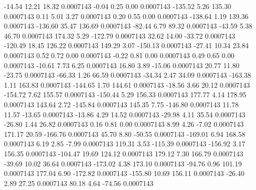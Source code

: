      -14.54       12.21       18.32     0.0007143
       -0.04        0.25        0.00     0.0007143
     -135.52        5.26      135.30     0.0007143
        0.11        5.01        3.27     0.0007143
        0.20        0.55        0.00     0.0007143
     -138.64        1.19      139.36     0.0007143
     -136.60       35.47      136.69     0.0007143
      -82.44        6.79       89.32     0.0007143
      -43.59        5.38       46.70     0.0007143
      174.32        5.29     -172.79     0.0007143
       32.62       14.00      -33.72     0.0007143
     -120.49       18.45      126.22     0.0007143
      149.29        3.07     -150.13     0.0007143
      -27.41       10.34       23.84     0.0007143
        0.52        0.72        0.00     0.0007143
       -0.22        0.81        0.00     0.0007143
        0.49        0.65        0.00     0.0007143
      -10.61        7.73        6.25     0.0007143
       16.80        3.89      -15.06     0.0007143
       20.77       11.80      -23.75     0.0007143
      -66.33        1.26       66.59     0.0007143
      -34.34        2.47       34.09     0.0007143
     -163.38        1.11      163.83     0.0007143
     -144.65        1.70      144.61     0.0007143
      -18.56        3.66       20.12     0.0007143
     -154.72        7.62      155.57     0.0007143
     -150.44        5.29      156.33     0.0007143
      177.77        4.14      178.95     0.0007143
      143.64        2.72     -145.84     0.0007143
      145.35        7.75     -146.80     0.0007143
       11.78       11.57      -13.65     0.0007143
      -13.86        4.29       14.52     0.0007143
      -29.98        4.11       35.54     0.0007143
      -26.80        1.44       26.82     0.0007143
        0.16        0.81        0.00     0.0007143
        8.99        4.26       -7.02     0.0007143
      171.17       20.59     -166.76     0.0007143
       45.70        8.80      -50.55     0.0007143
     -169.01        6.94      168.58     0.0007143
        6.19        2.85       -7.99     0.0007143
      119.31        3.53     -115.39     0.0007143
     -156.92        3.17      156.35     0.0007143
     -104.47       19.69      124.12     0.0007143
      179.12        7.30      166.79     0.0007143
      -39.69       10.02       36.64     0.0007143
     -173.02        4.38      173.10     0.0007143
      -94.76        0.96      101.19     0.0007143
      177.04        6.90     -172.82     0.0007143
     -155.80       10.69      156.11     0.0007143
      -26.40        2.89       27.25     0.0007143
       80.18        4.64      -74.56     0.0007143

